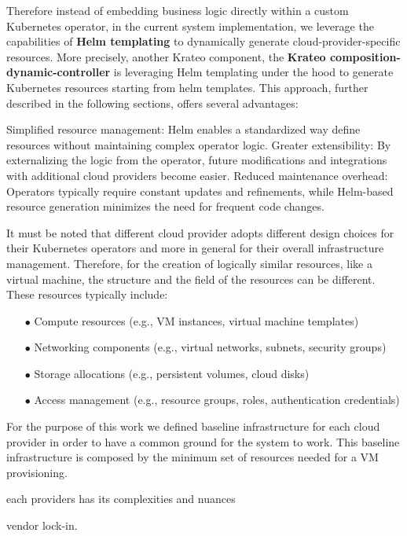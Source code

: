 Therefore instead of embedding business logic directly within a custom Kubernetes operator, in the current system implementation, we leverage the capabilities of \textbf{Helm templating} to dynamically generate cloud-provider-specific resources. More precisely, another Krateo component, the \textbf{Krateo composition-dynamic-controller} is leveraging Helm templating under the hood to generate Kubernetes resources starting from helm templates.
This approach, further described in the following sections, offers several advantages:

Simplified resource management:  Helm enables a standardized way define resources without maintaining complex operator logic.
Greater extensibility:  By externalizing the logic from the operator, future modifications and integrations with additional cloud providers become easier.
Reduced maintenance overhead: Operators typically require constant updates and refinements, while Helm-based resource generation minimizes the need for frequent code changes.

It must be noted that different cloud provider adopts different design choices for their Kubernetes operators and more in general for their overall infrastructure management. Therefore, for the creation of logically similar resources, like a virtual machine, the structure and the field of the resources can be different. 
These resources typically include:
\begin{itemize}[itemsep=0.2pt, topsep=1pt]
  \item[$\bullet$] Compute resources (e.g., VM instances, virtual machine templates)
  \item[$\bullet$] Networking components (e.g., virtual networks, subnets, security groups)
  \item[$\bullet$] Storage allocations (e.g., persistent volumes, cloud disks)
  \item[$\bullet$] Access management (e.g., resource groups, roles, authentication credentials)
\end{itemize}


For the purpose of this work we defined baseline infrastructure for each cloud provider in order to have a common ground for the system to work. This baseline infrastructure is composed by the minimum set of resources needed for a VM provisioning.

each providers has its complexities and nuances

vendor lock-in.





